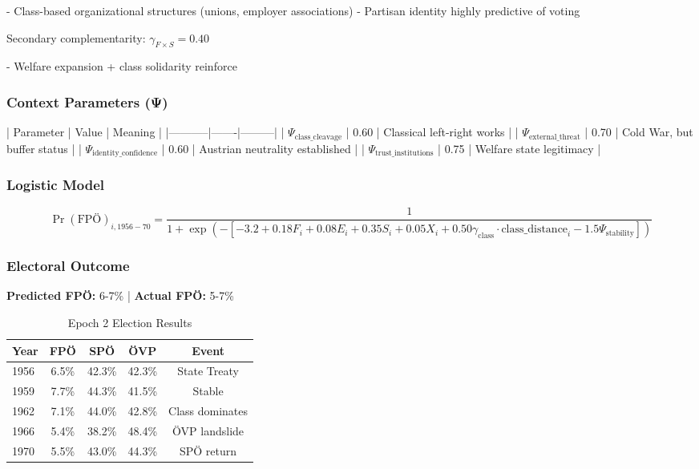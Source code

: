 - Class-based organizational structures (unions, employer associations)
- Partisan identity highly predictive of voting

Secondary complementarity: $\gamma_{F \times S} = 0.40$

- Welfare expansion + class solidarity reinforce

\subsubsection{Context Parameters (Ψ)}

| Parameter | Value | Meaning |
|-----------|-------|---------|
| $\Psi_{\text{class\_cleavage}}$ | 0.60 | Classical left-right works |
| $\Psi_{\text{external\_threat}}$ | 0.70 | Cold War, but buffer status |
| $\Psi_{\text{identity\_confidence}}$ | 0.60 | Austrian neutrality established |
| $\Psi_{\text{trust\_institutions}}$ | 0.75 | Welfare state legitimacy |

\subsubsection{Logistic Model}

$$\Pr(\text{FPÖ})_{i,1956-70} = \frac{1}{1 + \exp(-[-3.2 + 0.18 F_i + 0.08 E_i + 0.35 S_i + 0.05 X_i + 0.50 \gamma_{\text{class}} \cdot \text{class\_distance}_i - 1.5 \Psi_{\text{stability}}])}$$

\subsubsection{Electoral Outcome}

\textbf{Predicted FPÖ:} 6-7\% | \textbf{Actual FPÖ:} 5-7\%

\begin{table}[h]
\centering
\caption{Epoch 2 Election Results}
\label{tab:epoch2-results}
\begin{tabular}{lcccc}
\toprule
Year & FPÖ & SPÖ & ÖVP & Event \\
\midrule
1956 & 6.5\% & 42.3\% & 42.3\% & State Treaty \\
1959 & 7.7\% & 44.3\% & 41.5\% & Stable \\
1962 & 7.1\% & 44.0\% & 42.8\% & Class dominates \\
1966 & 5.4\% & 38.2\% & 48.4\% & ÖVP landslide \\
1970 & 5.5\% & 43.0\% & 44.3\% & SPÖ return \\
\bottomrule
\end{tabular}
\end{table}

